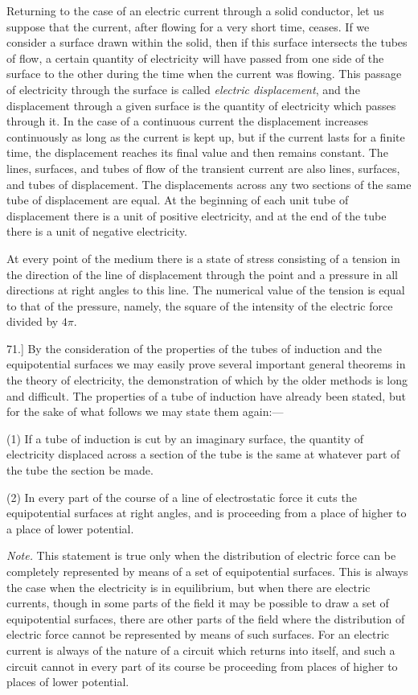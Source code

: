\documentclass[12pt,oneside]{book}[2021/10/04]
\newcommand{\Runhead}[1]{\fancyhead[C]{\iffloatpage{}{\small#1}}}
\newcommand{\article}[1]{\phantomsection \label{art:#1}{#1.]}}
\newcommand{\¬}{\hphantom{0}}
\begin{document}
Returning to the case of an electric current through a solid
conductor, let us suppose that the current, after flowing for a
very short time, ceases. If we consider a surface drawn within
the solid, then if this surface intersects the tubes of flow, a certain
quantity of electricity will have passed from one side of the surface
to the other during the time when the current was flowing. This
passage of electricity through the surface is called \textit{electric displacement},
and the displacement through a given surface is the
quantity of electricity which passes through it. In the case of
a continuous current the displacement increases continuously as
long as the current is kept up, but if the current lasts for a finite
time, the displacement reaches its final value and then remains
constant. The lines, surfaces, and tubes of flow of the transient
current are also lines, surfaces, and tubes of displacement. The
displacements across any two sections of the same tube of displacement
are equal. At the beginning of each unit tube of
displacement there is a unit of positive electricity, and at the end
of the tube there is a unit of negative electricity.

At every point of the medium there is a state of stress consisting
of a tension in the direction of the line of displacement
through the point and a pressure in all directions at right angles
to this line. The numerical value of the tension is equal to that
of the pressure, namely, the square of the intensity of the electric
force divided by \(4 \pi\).

\article{71} By the consideration of the properties of the tubes of
induction and the equipotential surfaces we may easily prove
several important general theorems in the theory of electricity,
the demonstration of which by the older methods is long and
difficult. The properties of a tube of induction have already
been stated, but for the sake of what follows we may state them
again:---
\Runhead{TUBES OF INDUCTION AND LINES OF FORCE.}

(1) If a tube of induction is cut by an imaginary surface, the
quantity of electricity displaced across a section of the tube is the
same at whatever part of the tube the section be made.

(2) In every part of the course of a line of electrostatic force
it cuts the equipotential surfaces at right angles, and is proceeding
from a place of higher to a place of lower potential.

\textit{Note.} This statement is true only when the distribution of
electric force can be completely represented by means of a set of
equipotential surfaces. This is always the case when the electricity
is in equilibrium, but when there are electric currents, though in
some parts of the field it may be possible to draw a set of equipotential
surfaces, there are other parts of the field where the
distribution of electric force cannot be represented by means of
such surfaces. For an electric current is always of the nature of
a circuit which returns into itself, and such a circuit cannot in
every part of its course be proceeding from places of higher to
places of lower potential.
\end{document}
